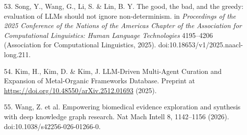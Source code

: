 \documentclass[
]{article}
\begin{document}
53. Song, Y., Wang, G., Li, S. \& Lin, B. Y. The good, the bad, and the greedy: evaluation of LLMs should not ignore non-determinism. in \emph{Proceedings of the 2025 Conference of the Nations of the Americas Chapter of the Association for Computational Linguistics: Human Language Technologies} 4195--4206 (Association for Computational Linguistics, 2025). doi:10.18653/v1/2025.naacl-long.211.

54. Kim, H., Kim, D. \& Kim, J. LLM-Driven Multi-Agent Curation and Expansion of Metal-Organic Frameworks Database. Preprint at \url{https://doi.org/10.48550/arXiv.2512.01693} (2025).

55. Wang, Z. et al. Empowering biomedical evidence exploration and synthesis with deep knowledge graph research. Nat Mach Intell 8, 1142--1156 (2026). doi:10.1038/s42256-026-01266-0.
\end{document}
